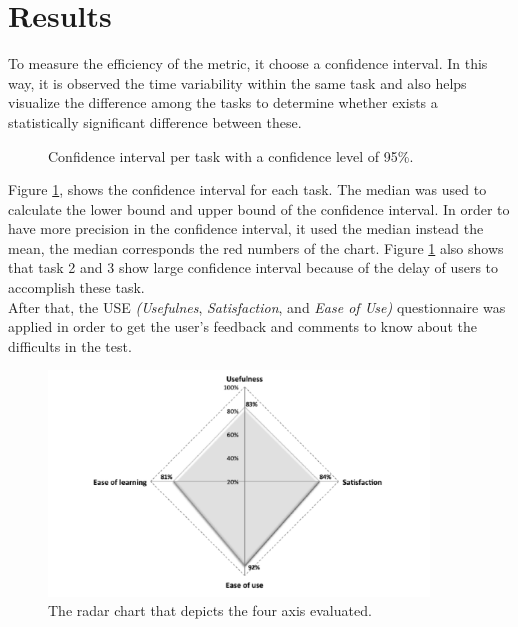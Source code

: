 \section{Results}

To measure the efficiency of the metric, it choose a confidence
interval. In this way, it is observed the time variability within the
same task and also helps visualize the difference among the tasks to
determine whether exists a statistically significant difference
between these. 
\begin{figure}
\centering
\captionsetup{font=footnotesize}
\caption{Confidence interval per task with a confidence level of 95\%.}
\label{fig:ci95}   
\end{figure}
Figure \ref{fig:ci95}, shows the confidence interval for each task.
The median was used to calculate the  lower bound and upper bound of
the confidence interval. In  order to have more precision in the
confidence interval, it used the median instead the mean, the median
corresponds the red numbers of the chart. Figure \ref{fig:ci95} also 
shows that task 2 and 3 show large confidence interval because of  
the delay of users to accomplish these task. \\ 
After that, the USE \textit{(Usefulnes}, \textit{Satisfaction}, and 
\textit{Ease of Use)} questionnaire \cite{morris2001experience} 
was applied in order to get the user's feedback and comments 
to know about the difficults in the test.  
\begin{figure}
\centering
\small
\captionsetup{font=footnotesize}
\includegraphics[width=0.9\textwidth]{img/radial.png}
\caption{\small{The radar chart that depicts the four axis 
evaluated.}}
\label{fig:radial}   
\end{figure}
